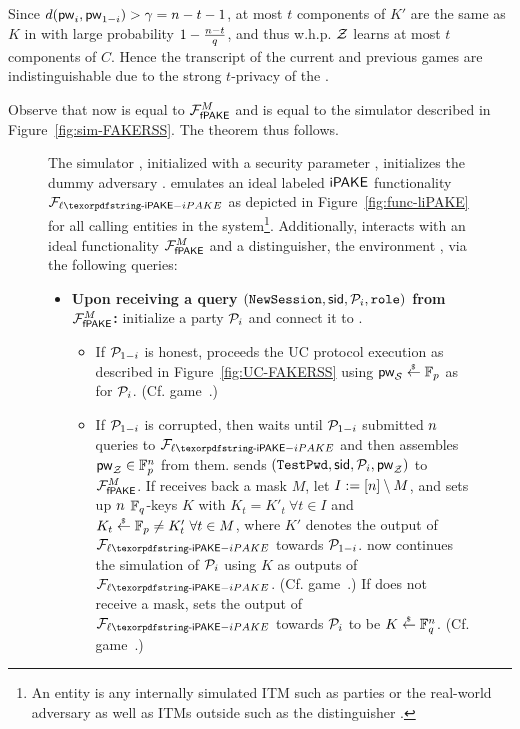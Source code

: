 \begin{games}
Since $d(\mathsf{pw}_{i},\mathsf{pw}_{1-i})>\gamma = n-t-1$, at most $t$ components of $K'$ are the same as $K$ in \previousgame with large probability $1-\frac{n-t}{q}$, and thus w.h.p. $\mathcal{Z}$ learns at most $t$ components of $C$. Hence the transcript of the current and previous games are indistinguishable due to the strong $t$-privacy of the \RSS.

Observe that now \Func is equal to $\mathcal{F}_\textsf{fPAKE}^M$ and \Sim is equal to the simulator described in Figure~\ref{fig:sim-FAKERSS}. The theorem thus follows.
\end{games}

\begin{figure}[ht!]
  \centering
  \begin{fboxenv}
    \begin{minipage}{0.95\textwidth}
      The simulator \Sim, initialized with a security parameter \SEC, initializes the dummy adversary \AdvA. \Sim emulates an ideal labeled $\textsf{iPAKE}$ functionality $\FliPAKE$ as depicted in Figure~\ref{fig:func-liPAKE} for all calling entities in the system\footnote{An entity is any internally simulated ITM such as parties or the real-world adversary as well as ITMs outside \Sim such as the distinguisher \Env.}. Additionally, \Sim interacts with an ideal functionality $\mathcal{F}_\textsf{fPAKE}^M$ and a distinguisher, the environment \Env, via the following queries:\\[-1.8em]
      \begin{itemize}
      \item
        \textbf{Upon receiving a query
        $(\texttt{NewSession},\mathsf{sid},\mathcal{P}_{i},\texttt{role})$ from $\mathcal{F}_\textsf{fPAKE}^M$:}
        initialize a party $\mathcal{P}_{i}$ and connect it to \AdvA. 
        \begin{itemize}
         \item If $\mathcal{P}_{1-i}$ is honest, \Sim proceeds the UC protocol execution as described in Figure~\ref{fig:UC-FAKERSS} using $\mathsf{pw}_{\mathcal{S}}\stackrel{{}_\$}{\leftarrow}\mathbb{F}_{p}$ as \password for $\mathcal{P}_{i}$. (Cf. game~.)
         \item If $\mathcal{P}_{1-i}$ is corrupted, then \Sim waits until $\mathcal{P}_{1-i}$ submitted $n$ queries to $\FliPAKE$ and then assembles $\mathsf{pw}_\mathcal{Z}\in\mathbb{F}_{p}^{n}$ from them. \Sim sends $(\texttt{TestPwd},\mathsf{sid},\mathcal{P}_{i},\mathsf{pw}_\mathcal{Z})$ to $\mathcal{F}_\textsf{fPAKE}^M$. If \Sim receives back a mask $M$, let $I:=[n]\setminus M$, and \Sim sets up $n$ $\mathbb{F}_q$-keys $K$ with $K_t=K'_t~\forall t\in I$ and $K_t\stackrel{{}_\$}{\leftarrow}\mathbb{F}_{p}\neq K'_t~\forall t\in M$, where $K'$ denotes the output of $\FliPAKE$ towards $\mathcal{P}_{1-i}$. \Sim now continues the simulation of $\mathcal{P}_{i}$ using $K$ as outputs of $\FliPAKE$. (Cf. game~.) If \Sim does not receive a mask, \Sim sets the output of $\FliPAKE$ towards $\mathcal{P}_{i}$ to be $K\stackrel{{}_\$}{\leftarrow}\mathbb{F}_q^{n}$. (Cf. game~.)

\end{itemize}
\end{itemize}
\end{minipage}
\end{fboxenv}
\end{figure}

